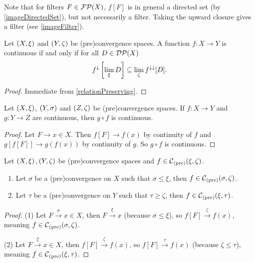 Note that for filters $F\in\operatorname{\mathcal{FP}}(X)$, $f[F]$ is in general a directed set (by \ref{imageDirectedSet}), but not necessarily a filter. Taking the upward closure gives a filter (see \ref{imageFilter}).

\begin{lemma}
Let $\left( X,\xi \right)$ and $\left( Y,\zeta \right)$ be (pre)convergence spaces. A function $f: X\to Y$ is continuous \textup{if and only if} for all $D \in \operatorname{\mathcal{DP}}(X)$
\[ f^{\downarrow}\left[\lim_\xi D \right] \subseteq \lim_\zeta f^{\downarrow\downarrow}[D]. \]
\end{lemma}
\begin{proof}
Immediate from \ref{relationPreserving}.
\end{proof}

\begin{lemma} \label{continuityComposition}
Let $\left( X,\xi \right)$, $\left( Y,\sigma \right)$ and $\left( Z,\zeta \right)$ be (pre)convergence spaces. If $f: X\to Y$ and $g: Y\to Z$ are continuous, then $g\circ f$ is continuous.
\end{lemma}
\begin{proof}
Let $F\to x\in X$. Then $f[F] \to f(x)$ by continuity of $f$ and $g[f[F]] \to g(f(x))$ by continuity of $g$. So $g\circ f$ is continuous.
\end{proof}

\begin{lemma} \label{finerCoarserContinuity}
Let $\left( X,\xi \right), \left( Y,\zeta \right)$ be (pre)convergence spaces and $f\in \operatorname{\mathcal{C}}_\text{(pre)}(\xi, \zeta)$.
\begin{enumerate}
\item Let $\sigma$ be a (pre)convergence on $X$ such that $\sigma \leq \xi$, then $f\in \operatorname{\mathcal{C}}_\text{(pre)}(\sigma, \zeta)$.
\item Let $\tau$ be a (pre)convergence on $Y$ such that $\tau \geq \zeta$, then $f\in \operatorname{\mathcal{C}}_\text{(pre)}(\xi, \tau)$.
\end{enumerate}
\end{lemma}
\begin{proof}
(1) Let $F\overset{\sigma}{\longrightarrow} x \in X$, then $F\overset{\xi}{\longrightarrow} x$ (because $\sigma \leq \xi$), so $f[F]\overset{\zeta}{\longrightarrow} f(x)$, meaning $f\in \operatorname{\mathcal{C}}_\text{(pre)}(\sigma, \zeta)$.

(2) Let $F\overset{\xi}{\longrightarrow} x \in X$, then $f[F]\overset{\zeta}{\longrightarrow} f(x)$, so $f[F]\overset{\tau}{\longrightarrow} f(x)$  (because $\zeta \leq \tau$), meaning $f\in \operatorname{\mathcal{C}}_\text{(pre)}(\xi, \tau)$.
\end{proof}

